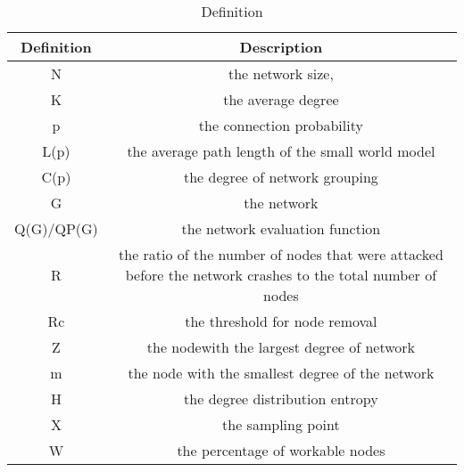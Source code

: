 \documentclass[AMA,STIX1COL]{WileyNJD-v2}
\begin{document}
\begin{table}[htbp]
\centering
\caption{Definition}
\label{Definition}
\begin{tabular}{@{}
>{\columncolor[HTML]{FFFFFF}}c 
>{\columncolor[HTML]{FFFFFF}}c @{}}
\toprule
Definition & Description                                                                                                                                           \\ \midrule
N    &   the network size,              \\ \midrule
K          & the average degree  \\ \midrule
p          & the connection probability     \\ \midrule
L(p)          & the average path length of the small world model                                                                                                                                 \\ \midrule
C(p)       & the  degree  of  network  grouping                                                                                                      \\ \midrule
G   &  the network \\ \midrule
Q(G)/QP(G)          &  the network evaluation function \\ \midrule
R   & the ratio of the number of nodes that were  attacked  before  the  network  crashes  to  the  total  number  of  nodes                                                                                                       \\ \midrule

Rc     & the threshold for node removal                                                                                                \\ \midrule
Z     & the nodewith the largest degree of network                                                                                                \\ \midrule
m     & the node with the smallest degree of the network                                                                                               \\ \midrule
H     & the degree distribution entropy                                                                                               \\ \midrule
X        &  the  sampling point                                                                                                           \\ \midrule
W     & the percentage of workable nodes                                                                                                           \\ \bottomrule


\end{tabular}
\end{table}
\end{document}
